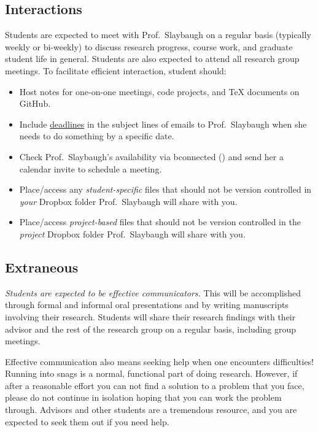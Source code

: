 \documentclass[12pt,twoside]{article}
\begin{document}
\subsection*{Interactions}

Students are expected to meet with Prof.\ Slaybaugh on a regular basis (typically weekly or bi-weekly) to discuss research progress, course work, and graduate student life in general. Students are also expected to attend all research group meetings. To facilitate efficient interaction, student should: 
%
\begin{itemize}
\item Host notes for one-on-one meetings, code projects, and TeX documents on GitHub.
\item Include \underline{deadlines} in the subject lines of emails to Prof.\ Slaybaugh when she needs to do something by a specific date.
\item Check Prof.\ Slaybaugh's availability via bconnected () and send her a calendar invite to schedule a meeting.
\item Place/access any \textit{student-specific} files that should not be version controlled in \textit{your} Dropbox folder Prof.\ Slaybaugh will share with you. 
\item Place/access \textit{project-based} files that should not be version controlled in the \textit{project} Dropbox folder Prof.\ Slaybaugh will share with you.
\end{itemize}

\subsection*{Extraneous}

\textit{Students are expected to be effective communicators.} This will be accomplished through formal and informal oral presentations and by writing manuscripts involving their research. Students will share their research findings with their advisor and the rest of the research group on a regular basis, including group meetings.  

Effective communication also means seeking help when one encounters difficulties! Running into snags is a normal, functional part of doing research. However, if after a reasonable effort you can not find a solution to a problem that you face, please do not continue in isolation hoping that you can work the problem through. Advisors and other students are a tremendous resource, and you are expected to seek them out if you need help.
\end{document}
